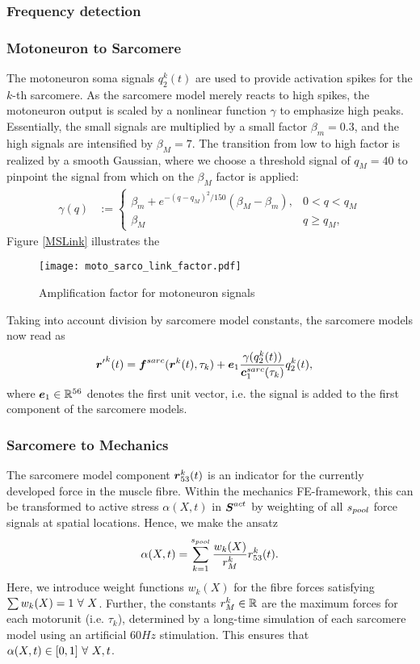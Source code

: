 \subsubsection{Frequency detection}

\subsubsection{Motoneuron to Sarcomere}
The motoneuron soma signals $q^k_2(t)$ are used to provide activation spikes for the $k$-th sarcomere.
As the sarcomere model merely reacts to high spikes, the motoneuron output is scaled by a nonlinear function $\gamma$ to emphasize high peaks.
Essentially, the small signals are multiplied by a small factor $\beta_m = 0.3$, and the high signals are intensified by $\beta_M = 7$.
The transition from low to high factor is realized by a smooth Gaussian,
where we choose a threshold signal of $q_M = 40$ to pinpoint the signal from which on the $\beta_M$ factor is applied:
\begin{align}
	\gamma(q) &:= \begin{cases}
		\beta_m + e^{-(q-q_M)^2/150}(\beta_M-\beta_m), & 0 < q < q_M\\
		\beta_M & q \geq q_M,
	\end{cases}
\end{align}
Figure \ref{MSLink} illustrates the 
\begin{figure}[!ht]
	\centering
	\texttt{[image: moto\_sarco\_link\_factor.pdf]}
	\caption{Amplification factor for motoneuron signals}
	\label{fig:MSLink}
\end{figure}
Taking into account division by sarcomere model constants, the sarcomere models now read as
\begin{align}
	{\boldsymbol{r}'}^k(t) &= \boldsymbol{f}^{sarc}(\boldsymbol{r}^k(t),\tau_k) + \boldsymbol{e}_1 \frac{\gamma(q_2^k(t))}{\boldsymbol{c}^{sarc}_1(\tau_k)}q_2^k(t),
\end{align}
where $\boldsymbol{e}_1 \in \mathbb{R}^{56}$ denotes the first unit vector, i.e. the signal is added to the first component of the sarcomere models.

\subsubsection{Sarcomere to Mechanics}
The sarcomere model component $\boldsymbol{r}_{53}^k(t)$ is an indicator for the currently developed force in the muscle fibre.
Within the mechanics FE-framework, this can be transformed to active stress $\alpha(X,t)$ in $\boldsymbol{S}^{act}$ by weighting of all ${s_{pool}}$ force signals at spatial locations.
Hence, we make the ansatz
\begin{align}
	\alpha(X,t) = \sum\limits_{k=1}^{s_{pool}} \frac{w_k(X)}{r^k_M} r^k_{53}(t).
\end{align}
Here, we introduce weight functions $w_k(X)$ for the fibre forces satisfying $\sum w_k(X) = 1 ~\forall~ X$.
Further, the constants $r^k_M\in\mathbb{R}$ are the maximum forces for each motorunit (i.e. $\tau_k$), determined by a long-time simulation of each sarcomere model using an
artificial $60Hz$ stimulation.
This ensures that $\alpha(X,t) \in [0,1] ~\forall~ X,t$. 

